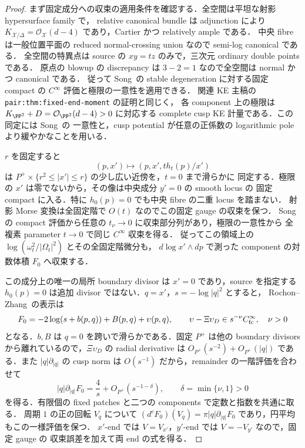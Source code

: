 \begin{proof}
まず固定成分への収束の適用条件を確認する．全空間は平坦な射影 hypersurface family で，
relative canonical bundle は adjunction により
$K_{\mathcal X/\Delta}=\mathcal O_{\mathcal X}(d-4)$ であり，Cartier かつ relatively ample である．
中央 fibre は一般位置平面の reduced normal-crossing union なので semi-log canonical である．
全空間の特異点は source の $xy=tz$ のみで，三次元 ordinary double points である．
原点の blowup の discrepancy は $3-2=1$ なので全空間は normal かつ canonical である．
従って Song~\cite[Definition~2.3, Lemmas~4.4--4.5]{SongNegativeKE}の stable degeneration
に対する固定 compact の $C^\infty$ 評価と極限の一意性を適用できる．
関連 KE 主稿\cite{KELocalCurrent}の \texttt{pair:thm:fixed-end-moment} の証明と同じく，
各 component 上の極限は $K_{\PP^2}+D=\mathcal O_{\PP^2}(d-4)>0$ に対応する
complete cusp KE 計量である．この同定には Song~\cite[Lemma~3.7]{SongNegativeKE}の
一意性と，cusp potential が任意の正係数の logarithmic pole より緩やかなことを用いる．

$r$ を固定すると
\[
 (p,x')\longmapsto(p,x',t h_t(p)/x')
\]
は $P^+\times\{r^2\le|x'|\le r\}$ の少し広い近傍を，$t=0$ まで滑らかに
同定する．極限の $x'$ は零でないから，その像は中央成分 $y'=0$ の smooth locus の
固定 compact に入る．特に $h_0(p)=0$ でも中央 fibre の二重 locus を踏まない．
射影 Morse 変換は全固定階で $O(t)$ なのでこの固定 gauge の収束を保つ．
Song の compact 評価から任意の $t_\nu\to0$ に収束部分列があり，極限の一意性から
全複素 parameter $t\to0$ で同じ $C^\infty$ 収束を得る．
従ってこの領域上の $\log(\omega_t^2/|\Omega_t|^2)$ とその全固定階微分も，
$d\log x'\wedge dp$ で測った component の対数体積 $F_0$ へ収束する．

この成分上の唯一の局所 boundary divisor は $x'=0$ であり，source を指定する
$h_0(p)=0$ は追加 divisor ではない．$q=x'$，$s=-\log|q|^2$ とすると，
Rochon--Zhang~\cite[\S5, (5.5)--(5.6), Theorem~5.1]{RochonZhang}の表示は
\[
 F_0=-2\log(s+b(p,q))+B(p,q)+\upsilon(p,q),\qquad
 \upsilon-\Xi\upsilon_D\in s^{-\nu}C^\infty_{\rm fc},\quad \nu>0
\]
となる．$b,B$ は $q=0$ を跨いで滑らかである．固定 $P^+$ は他の boundary divisors
から離れているので，$\Xi\upsilon_D$ の radial derivative は
$O_{P^+}(s^{-2})+O_{P^+}(|q|)$ である．また $|q|\partial_{|q|}$ の cusp norm は
$O(s^{-1})$ だから，remainder の一階評価を合わせて
\[
 |q|\partial_{|q|}F_0=\frac4s+O_{P^+}(s^{-1-\delta}),\qquad
 \delta=\min\{\nu,1\}>0
\]
を得る．有限個の fixed patches と二つの components で定数と指数を共通に取る．
周期 $1$ の正の回転 $V_q$ について
$(d^cF_0)(V_q)=\pi |q|\partial_{|q|}F_0$ であり，円平均もこの一様評価を保つ．
$x'$-end では $V=V_{x'}$，$y'$-end では $V=-V_{y'}$ なので，固定 gauge の
収束誤差を加えて両 end の式を得る．


\end{proof}

